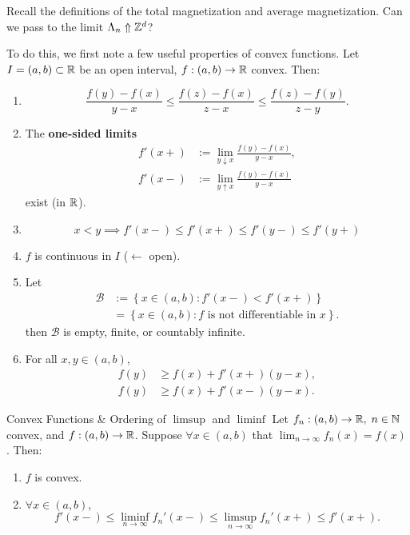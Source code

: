\documentclass{article}
\begin{document}
Recall the definitions of the total magnetization and average magnetization. Can we pass to the limit $\Lambda_n \Uparrow \mathbb{Z}^d$?

To do this, we first note a few useful properties of convex functions. Let $I = (a, b) \subset \mathbb{R}$ be an open interval, $f : (a, b) \rightarrow \mathbb{R}$ convex. Then:

\begin{enumerate}
\item
  \begin{equation}
    \frac{f(y) - f(x)}{y - x} \leq \frac{f(z) - f(x)}{z - x} \leq \frac{f(z) - f(y)}{z - y}.
  \end{equation}
\item The \textbf{one-sided limits} 
\begin{align}
\label{eq:10}
  f' (x+) &:= \lim_{y \downarrow x} \frac{f(y) - f(x)}{y-x}, \\
  f' (x-) &:= \lim_{y \uparrow x} \frac{f(y) - f(x)}{y - x}
\end{align}
exist (in $\mathbb{R}$).
\item
  \begin{equation}
    x < y \implies f' (x-) \leq f' (x + ) \leq f' (y-) \leq f' (y+)
  \end{equation}
\item $f$ is continuous in $I$ ($\leftarrow$ open).
\item Let 
\begin{align}
\label{eq:11}
  \mathcal{B} &:= \left\{ x \in \left( a, b \right) : f' (x-) < f' (x+)  \right\} \\
  &= \left\{ x \in \left( a, b \right) : f \text{ is not differentiable in }x \right\}. 
\end{align}
then $\mathcal{B}$ is empty, finite, or countably infinite.
\item For all $x, y \in \left( a, b \right)$, 
\begin{align}
\label{eq:12}
  f(y) &\geq f(x) + f' (x+) (y - x),\\
  f(y) &\geq f(x) + f' (x-) (y - x).
\end{align}
\end{enumerate}

\begin{Lemma}{Convex Functions \& Ordering of $\limsup$ and $\liminf$}{}{}
  Let $f_n : \left( a, b \right) \rightarrow \mathbb{R}, \; n \in \mathbb{N}$ convex, and $f : \left(  a, b \right) \rightarrow \mathbb{R}$. Suppose $\forall x \in \left( a, b \right)$ that $\lim_{n \rightarrow \infty} f_n(x) = f(x)$. Then:
  \begin{enumerate}
  \item $f$ is convex.
  \item $\forall x \in \left( a, b \right)$,
    \begin{equation}
      f' (x-) \leq \liminf_{n \rightarrow \infty} f_n' (x-) \leq \limsup_{n \rightarrow \infty} f_n' (x+) \leq f' (x+).
    \end{equation}
  \end{enumerate}
\end{Lemma}
\end{document}
